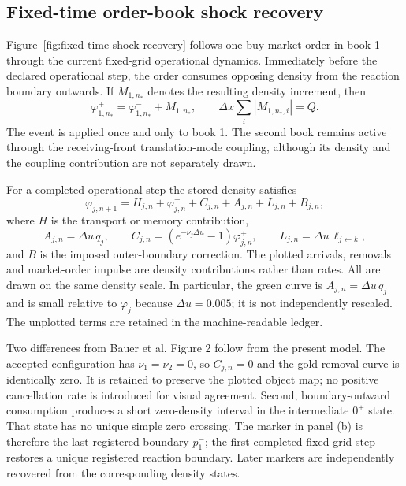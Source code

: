 
\subsection{Fixed-time order-book shock recovery}
\label{app:fixed-time-shock-recovery}

Figure~\ref{fig:fixed-time-shock-recovery} follows one buy market order in
book 1 through the current fixed-grid operational dynamics.  Immediately
before the declared operational step, the order consumes opposing density
from the reaction boundary outwards.  If $M_{1,n_*}$ denotes the resulting
density increment, then
\begin{equation}
  \varphi^+_{1,n_*}=\varphi^-_{1,n_*}+M_{1,n_*},
  \qquad
  \Delta x\sum_i |M_{1,n_*,i}|=Q.
\end{equation}
The event is applied once and only to book 1.  The second book remains active
through the receiving-front translation-mode coupling, although its density
and the coupling contribution are not separately drawn.

For a completed operational step the stored density satisfies
\begin{equation}
  \varphi_{j,n+1}
  =H_{j,n}+\varphi^+_{j,n}+C_{j,n}+A_{j,n}+L_{j,n}+B_{j,n},
\end{equation}
where $H$ is the transport or memory contribution,
\begin{equation}
  A_{j,n}=\Delta u\,q_j,
  \qquad
  C_{j,n}=\left(e^{-\nu_j\Delta u}-1\right)\varphi^+_{j,n},
  \qquad
  L_{j,n}=\Delta u\,\ell_{j\leftarrow k},
\end{equation}
and $B$ is the imposed outer-boundary correction.  The plotted arrivals,
removals and market-order impulse are density contributions rather than rates.
All are drawn on the same density scale.  In particular, the green curve is
$A_{j,n}=\Delta u\,q_j$ and is small relative to $\varphi_j$ because
$\Delta u=0.005$; it is not independently rescaled.  The unplotted terms are
retained in the machine-readable ledger.

Two differences from Bauer et al. Figure 2 follow from the present model.  The
accepted configuration has $\nu_1=\nu_2=0$, so $C_{j,n}=0$ and the gold
removal curve is identically zero.  It is retained to preserve the plotted
object map; no positive cancellation rate is introduced for visual agreement.
Second, boundary-outward consumption produces a short zero-density interval in
the intermediate $0^+$ state.  That state has no unique simple zero crossing.
The marker in panel (b) is therefore the last registered boundary $p_1^-$;
the first completed fixed-grid step restores a unique registered reaction
boundary.  Later markers are independently recovered from the corresponding
density states.

